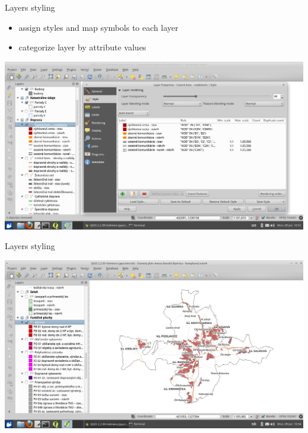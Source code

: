 \documentclass[12pt]{beamer}
\begin{document}
\begin{frame}{Layers styling}
	\begin{itemize}
		\item assign styles and map symbols to each layer
		\item categorize layer by attribute values
	\end{itemize}
	\begin{center}
		\includegraphics[keepaspectratio=true,height=0.6\textheight]{images/real-world-example/project-layer-style.png}
	\end{center}
\end{frame}


\begin{frame}{Layers styling}
	\begin{center}
		\includegraphics[keepaspectratio=true,height=0.6\textheight]{images/real-world-example/project-layer-style-ready.png}
	\end{center}
\end{frame}
\end{document}
